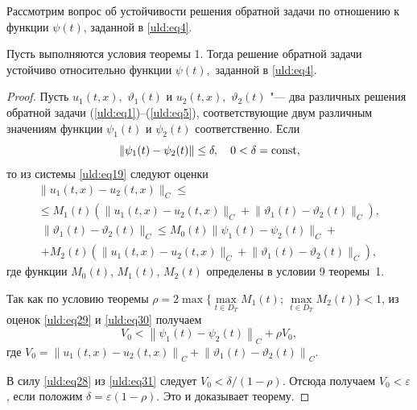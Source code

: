 \smallskip

 Рассмотрим
вопрос об устойчивости решения обратной задачи по отношению к функции $\psi  (t)$, заданной в \eqref{uld:eq4}.

\begin{theorem}[2]Пусть выполняются условия теоремы {\rm 1.} Тогда
решение обратной задачи устойчиво относительно функции $\psi (t),$ заданной в \eqref{uld:eq4}{\rm .}
\end{theorem}

\begin{proof}
Пусть $ u_1(t, x),$ $\vartheta_1  (t) $ и $ u_2  (t , x) ,$ $ \vartheta _2  (t)  $ "--- два различных решения обратной задачи (\ref{uld:eq1})--(\ref{uld:eq5}), соответствующие двум различным значениям функции $\psi _1  (t) $ и $\psi _2  (t)$ соответственно. 
Если
\begin{equation}
\label{uld:eq28}
\left\| \psi _1  (t)-\psi _2  (t) \right\|\le \delta ,\quad    0<\delta ={\rm const},
\end{equation}
то из системы \eqref{uld:eq19} следуют оценки
\begin{multline}
\label{uld:eq29}
\bigl\| u_1 ( t , x)-u_2 ( t , x) \bigr\|_C \le 
\\
 \le M_1 (t) \left( \bigl\| u_1 ( t, x)-u_2 ( t , x) \bigr\|_C +\bigl\| \vartheta _1 (
t)-\vartheta _2 ( t) \bigr\|_C \right),
\end{multline}
\begin{multline}
\label{uld:eq30}
\bigl\| \vartheta _1 ( t)-\vartheta _2 ( t) \bigr\|_C  \le M_0 (t)  \bigl\| \psi _1( t)-\psi _2 ( t)
\bigr\|_C +
\\
+M_2 (t)  \left(  \bigl\|  u_1( t,  x)-u_2  ( t , x) \bigr\|_C +\bigl\|
\vartheta _1 ( t)-\vartheta _2 ( t) \bigr\|_C\right),
\end{multline}
где функции $M_0(t)$, $M_1(t)$, $M_2(t)$ определены в условии 9 теоремы~1.

Так как по условию теоремы $\rho =2  \max  \bigl\{ \max\limits_{t\in D_T} M_1 (t);\, \max\limits_{t\in D_T} M_2 (t) \bigr\}<1$, из оценок
\eqref{uld:eq29} и \eqref{uld:eq30} получаем
\begin{equation}
\label{uld:eq31}
V_0 < \left\| \psi _1( t)-\psi _2 ( t) \right\|_C + \rho   V_0,
\end{equation}
где $V_0 = \left\| u_1( t, x)-u_2 ( t , x) \right\|_C +\left\| \vartheta _1 ( t)-\vartheta _2
(t) \right\|_C$.

В силу \eqref{uld:eq28} из \eqref{uld:eq31} следует $V_0 < {\delta }/({1-\rho})$. 
Отсюда получаем $V_0 <\varepsilon $, если положим $\delta =\varepsilon  (1-\rho )$. Это и доказывает
теорему.
\end{proof}

